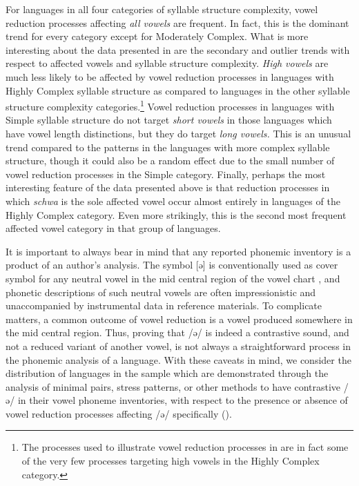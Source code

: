   For languages in all four categories of syllable structure complexity, vowel reduction processes affecting \textit{all vowels} are frequent. In fact, this is the dominant trend for every category except for Moderately Complex. What is more interesting about the data presented in  are the secondary and outlier trends with respect to affected vowels and syllable structure complexity. \textit{High vowels} are much less likely to be affected by vowel reduction processes in languages with Highly Complex syllable structure as compared to languages in the other syllable structure complexity categories.\footnote{{The  processes used to illustrate vowel reduction processes in  are in fact some of the very few processes targeting high vowels in the Highly Complex category.}} Vowel reduction processes in languages with Simple syllable structure do not target \textit{short vowels} in those languages which have vowel length distinctions, but they do target \textit{long vowels.} This is an unusual trend compared to the patterns in the languages with more complex syllable structure, though it could also be a random effect due to the small number of vowel reduction processes in the Simple category. Finally, perhaps the most interesting feature of the data presented above is that reduction processes in which \textit{schwa} is the sole affected vowel occur almost entirely in languages of the Highly Complex category. Even more strikingly, this is the second most frequent affected vowel category in that group of languages.

  It is important to always bear in mind that any reported phonemic inventory is a product of an author’s analysis. The symbol [ə] is conventionally used as cover symbol for any neutral vowel in the mid central region of the vowel chart \citep[280]{Laver1994}, and phonetic descriptions of such neutral vowels are often impressionistic and unaccompanied by instrumental data in reference materials. To complicate matters, a common outcome of vowel reduction is a vowel produced somewhere in the mid central region. Thus, proving that /ə/ is indeed a contrastive sound, and not a reduced variant of another vowel, is not always a straightforward process in the phonemic analysis of a language. With these caveats in mind, we consider the distribution of languages in the sample which are demonstrated through the analysis of minimal pairs, stress patterns, or other methods to have contrastive /ə/ in their vowel phoneme inventories, with respect to the presence or absence of vowel reduction processes affecting /ə/ specifically ().

